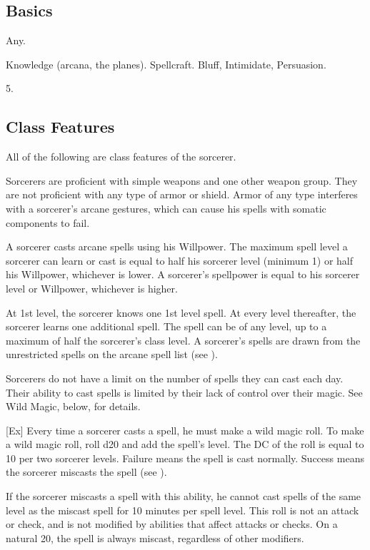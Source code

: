 \subsection{Basics}

 Any.

 Knowledge (arcana, the planes).
 Spellcraft.
 Bluff, Intimidate, Persuasion.

 5.

\subsection{Class Features}
All of the following are class features of the sorcerer.

Sorcerers are proficient with simple weapons  and one other weapon group.
They are not proficient with any type of armor or shield.
Armor of any type interferes with a sorcerer's arcane gestures, which can cause his spells with somatic components to fail.

A sorcerer casts arcane spells using his Willpower.
The maximum spell level a sorcerer can learn or cast is equal to half his sorcerer level (minimum 1) or half his Willpower, whichever is lower.
A sorcerer's spellpower is equal to his sorcerer level or Willpower, whichever is higher.

At 1st level, the sorcerer knows one 1st level spell.
At every level thereafter, the sorcerer learns one additional spell.
The spell can be of any level, up to a maximum of half the sorcerer's class level.
A sorcerer's spells are drawn from the unrestricted spells on the arcane spell list (see ).

Sorcerers do not have a limit on the number of spells they can cast each day.
Their ability to cast spells is limited by their lack of control over their magic.
See Wild Magic, below, for details.

[Ex]
Every time a sorcerer casts a spell, he must make a wild magic roll.
To make a wild magic roll, roll d20 and add the spell's level.
The DC of the roll is equal to 10  per two sorcerer levels.
Failure means the spell is cast normally.
Success means the sorcerer miscasts the spell (see ).

If the sorcerer miscasts a spell with this ability, he cannot cast spells of the same level as the miscast spell for 10 minutes per spell level.
This roll is not an attack or check, and is not modified by abilities that affect attacks or checks.
On a natural 20, the spell is always miscast, regardless of other modifiers.


